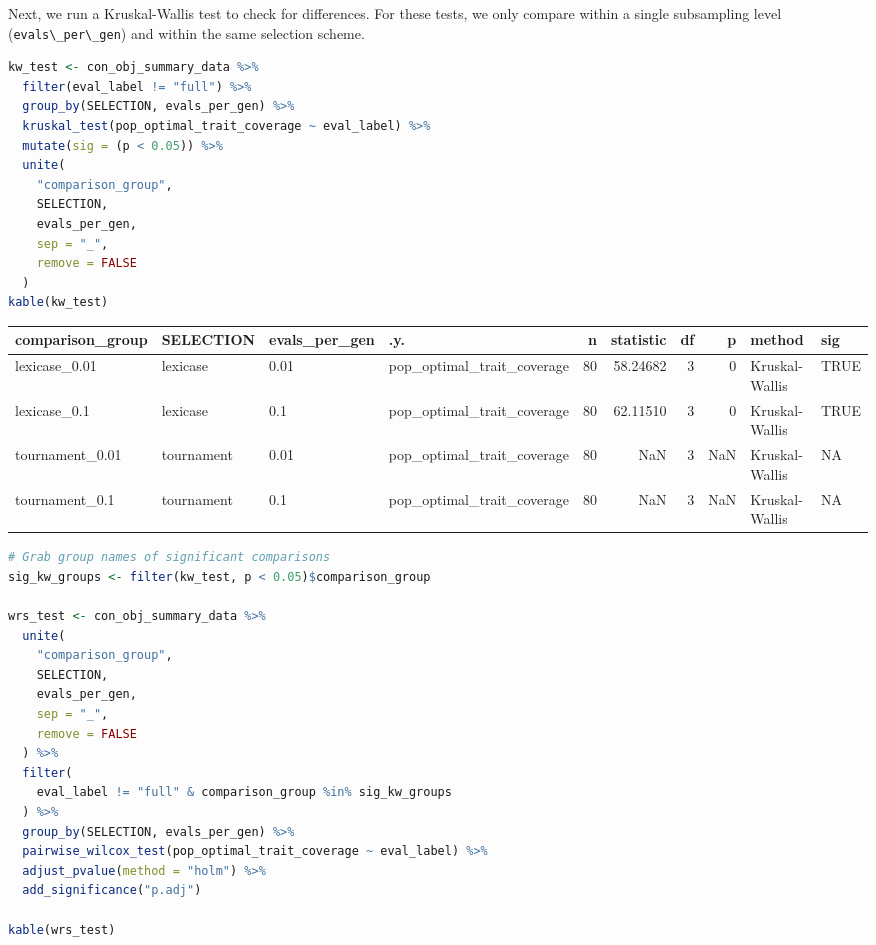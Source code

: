 \documentclass[
]{book}
\newcommand{\passthrough}[1]{#1}
\begin{document}
Next, we run a Kruskal-Wallis test to check for differences.
For these tests, we only compare within a single subsampling level (\passthrough{\lstinline!evals\_per\_gen!}) and within the same selection scheme.

\begin{lstlisting}[language=R]
kw_test <- con_obj_summary_data %>%
  filter(eval_label != "full") %>%
  group_by(SELECTION, evals_per_gen) %>%
  kruskal_test(pop_optimal_trait_coverage ~ eval_label) %>%
  mutate(sig = (p < 0.05)) %>%
  unite(
    "comparison_group",
    SELECTION,
    evals_per_gen,
    sep = "_",
    remove = FALSE
  )
kable(kw_test)
\end{lstlisting}

\begin{tabular}{l|l|l|l|r|r|r|r|l|l}
\hline
comparison\_group & SELECTION & evals\_per\_gen & .y. & n & statistic & df & p & method & sig\\
\hline
lexicase\_0.01 & lexicase & 0.01 & pop\_optimal\_trait\_coverage & 80 & 58.24682 & 3 & 0 & Kruskal-Wallis & TRUE\\
\hline
lexicase\_0.1 & lexicase & 0.1 & pop\_optimal\_trait\_coverage & 80 & 62.11510 & 3 & 0 & Kruskal-Wallis & TRUE\\
\hline
tournament\_0.01 & tournament & 0.01 & pop\_optimal\_trait\_coverage & 80 & NaN & 3 & NaN & Kruskal-Wallis & NA\\
\hline
tournament\_0.1 & tournament & 0.1 & pop\_optimal\_trait\_coverage & 80 & NaN & 3 & NaN & Kruskal-Wallis & NA\\
\hline
\end{tabular}

\begin{lstlisting}[language=R]
# Grab group names of significant comparisons
sig_kw_groups <- filter(kw_test, p < 0.05)$comparison_group

wrs_test <- con_obj_summary_data %>%
  unite(
    "comparison_group",
    SELECTION,
    evals_per_gen,
    sep = "_",
    remove = FALSE
  ) %>%
  filter(
    eval_label != "full" & comparison_group %in% sig_kw_groups
  ) %>%
  group_by(SELECTION, evals_per_gen) %>%
  pairwise_wilcox_test(pop_optimal_trait_coverage ~ eval_label) %>%
  adjust_pvalue(method = "holm") %>%
  add_significance("p.adj")

kable(wrs_test)
\end{lstlisting}
\end{document}
